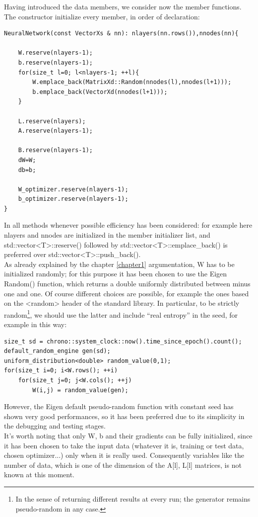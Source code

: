 \documentclass[12pt, a4paper]{report}
\theoremstyle{definition}
\begin{document}
\newpage \noindent
Having introduced the data members, we consider now the member functions.\\
The constructor initialize every member, in order of declaration:
\begin{lstlisting}[frame=single, showstringspaces=false]
NeuralNetwork(const VectorXs & nn): nlayers(nn.rows()),nnodes(nn){

	W.reserve(nlayers-1);
	b.reserve(nlayers-1);
	for(size_t l=0; l<nlayers-1; ++l){
		W.emplace_back(MatrixXd::Random(nnodes(l),nnodes(l+1)));	
		b.emplace_back(VectorXd(nnodes(l+1)));
	}

	L.reserve(nlayers);	
	A.reserve(nlayers-1);

	B.reserve(nlayers-1);	
	dW=W; 
	db=b; 

	W_optimizer.reserve(nlayers-1);
	b_optimizer.reserve(nlayers-1);
}
\end{lstlisting}
In all methods whenever possible efficiency has been considered: for example here {\ttfamily nlayers} and {\ttfamily nnodes} are initialized in the member initializer list, and {\ttfamily std::vector<T>::reserve()} followed by {\ttfamily std::vector<T>::emplace\_back()} is preferred over {\ttfamily std::vector<T>::push\_back()}.\\
As already explained by the chapter \ref{chapter1} argumentation, {\ttfamily W} has to be initialized randomly; for this purpose it has been chosen to use the Eigen {\ttfamily Random()} function, which returns a double uniformly distributed between minus one and one. Of course different choices are possible, for example the ones based on the {\ttfamily <random>} header of the standard library. In particular, to be strictly random\footnote{In the sense of returning different results at every run; the generator remains pseudo-random in any case.}, we should use the latter and include ``real entropy'' in the seed, for example in this way:
\begin{lstlisting}[frame=single, showstringspaces=false]
size_t sd = chrono::system_clock::now().time_since_epoch().count();
default_random_engine gen(sd);
uniform_distribution<double> random_value(0,1);
for(size_t i=0; i<W.rows(); ++i)
	for(size_t j=0; j<W.cols(); ++j)
		W(i,j) = random_value(gen);
\end{lstlisting}
However, the Eigen default pseudo-random function with constant seed has shown very good performances, so it has been preferred due to its simplicity in the debugging and testing stages.\\
It's worth noting that only {\ttfamily W}, {\ttfamily b} and their gradients can be fully initialized, since it has been chosen to take the input data (whatever it is, training or test data, chosen optimizer...) only when it is really used. Consequently variables like the number of data, which is one of the dimension of the {\ttfamily A[l], L[l]} matrices, is not known at this moment.\\
\end{document}
